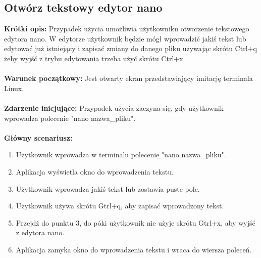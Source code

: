 \documentclass[10pt,a4paper]{report}
\begin{document}
\begin{adjustwidth}{2cm}{2cm}
\subsection{Otwórz tekstowy edytor nano}
\begin{minipage}{1\linewidth}
\textbf{Krótki opis:} Przypadek użycia umożliwia użytkowniku otworzenie tekstowego edytora nano. W edytorze użytkownik będzie mógł wprowadzić jakiś tekst lub edytować już istniejący i zapisać zmiany do danego pliku używając skrótu Ctrl+q żeby wyjść z trybu edytowania trzeba użyć skrótu Ctrl+x. \\ \\
\textbf{Warunek początkowy:} Jest otwarty ekran przedstawiający imitację terminala Linux. \\ \\
\textbf{Zdarzenie inicjujące:} Przypadek użycia zaczyna się, gdy użytkownik wprowadza polecenie "nano nazwa\_pliku". \\ \\
\textbf{Główny scenariusz:} 
\begin{enumerate}
\setlength\itemsep{0.2cm}
    \item Użytkownik wprowadza w terminalu polecenie "nano nazwa\_pliku".
    \item Aplikacja wyświetla okno do wprowadzenia tekstu.
    \item Użytkownik wprowadza jakiś tekst lub zostawia puste pole. 
    \item Użytkownik używa skrótu Gtrl+q, aby zapisać wprowadzony tekst.
    \item Przejdź do punktu 3, do póki użytkownik nie użyje skrótu Gtrl+x, aby wyjść z edytora nano. 
    \item Aplikacja zamyka okno do wprowadzenia tekstu i wraca do wiersza poleceń.
\end{enumerate}
\end{minipage}

\end{adjustwidth}
\end{document}
